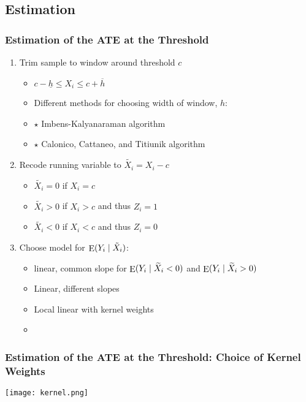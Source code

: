\documentclass[table, xcolor = {dvipsnames}, 9pt]{beamer}
\theoremstyle{plain}
\DeclareMathOperator{\E}{\rm{E}}
\begin{document}
\subsection{Estimation}
\begin{frame}
\frametitle{Estimation of the ATE at the Threshold}
\vfill
\begin{enumerate} \vfill
\item Trim sample to window around threshold $c$ \vfill
\begin{itemize} \vfill
\item $c - \underline{h} \leq X_i \leq c + \overline{h}$ \vfill
\item Different methods for choosing width of window, $h$: \vfill
\item[] $\star$ Imbens-Kalyanaraman algorithm \citep{imbenskalyanaraman2012} \vfill
\item[] $\star$ Calonico, Cattaneo, and Titiunik algorithm  \citep{calonicoetal2014} \vfill
\end{itemize} \vfill
\item Recode running variable to $\widetilde{X_i} = X_i - c$ \vfill
\begin{itemize} \vfill
\item $\widetilde{X_i} = 0$ if $X_i=c$ \vfill
\item $\widetilde{X_i} > 0$ if $X_i>c$ and thus $Z_i=1$ \vfill
\item $\widetilde{X_i} < 0$ if $X_i<c$ and thus $Z_i=0$ \vfill
\end{itemize} \vfill
\item Choose model for $\E(Y_i \mid \tilde X_i)$: \vfill
\begin{itemize} \vfill
\item linear, common slope for $\E(Y_i \mid \widetilde{X}_i< 0)$ and $\E(Y_i \mid \widetilde{X}_i > 0)$ \vfill
\item Linear, different slopes \vfill
\item Local linear with kernel weights \vfill
\item[]  \vfill
\end{itemize} \vfill
\end{enumerate} \vfill
\end{frame}
\begin{frame}
\frametitle{Estimation of the ATE at the Threshold: Choice of Kernel Weights}
\begin{center}
\texttt{[image: kernel.png]}
\end{center}
\end{frame}
\end{document}
